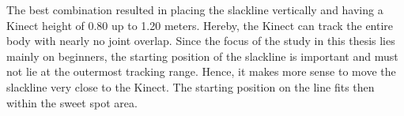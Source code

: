 The best combination resulted in placing the slackline vertically and having a Kinect height of 0.80 up to 1.20 meters. Hereby, the Kinect can track the entire body with nearly no joint overlap.
Since the focus of the study in this thesis lies mainly on beginners, the starting position of the slackline is important and must not lie at the outermost tracking range.
Hence, it makes more sense to move the slackline very close to the Kinect. The starting position on the line fits then within the sweet spot area.

